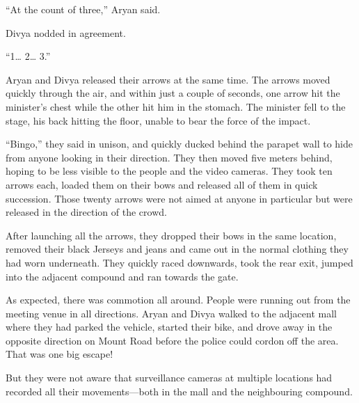 “At the count of three,” Aryan said.

Divya nodded in agreement.

“1… 2… 3.”

Aryan and Divya released their arrows at the same time. The arrows moved quickly
through the air, and within just a couple of seconds, one arrow hit the minister's
chest while the other hit him in the stomach. The minister fell to the
stage, his back hitting the floor, unable to bear the force of the impact.

“Bingo,” they said in unison, and quickly ducked behind the parapet wall to hide
from anyone looking in their direction. They then moved five meters
behind, hoping to be less visible to the people and the video cameras. They took
ten arrows each, loaded them on their bows and released all of them in quick
succession. Those twenty arrows were not aimed at anyone in particular but were
released in the direction of the crowd.

After launching all the arrows, they dropped their bows in the same
location, removed their black Jerseys and jeans and came out in the normal
clothing they had worn underneath. They quickly raced downwards, took the rear
exit, jumped into the adjacent compound and ran towards the gate.

As expected, there was commotion all around. People were running out from the
meeting venue in all directions. Aryan and Divya walked to the adjacent mall
where they had parked the vehicle, started their bike, and drove away in the
opposite direction on Mount Road before the police could cordon off the
area. That was one big escape!

But they were not aware that surveillance cameras at multiple locations had
recorded all their movements—both in the mall and the neighbouring compound.